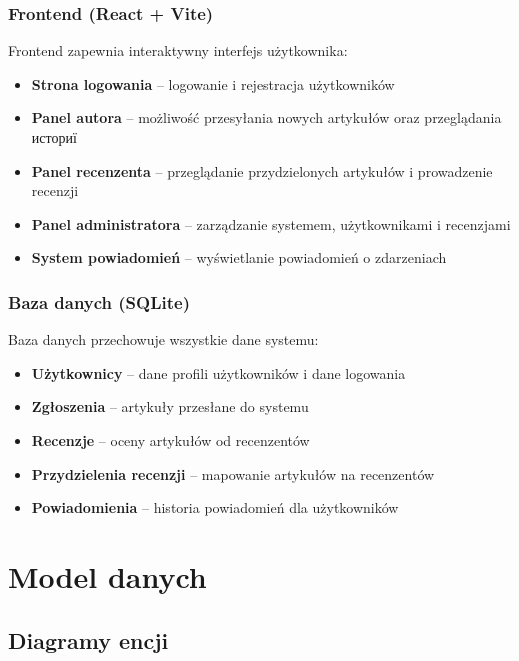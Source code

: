 \documentclass[times]{san}
\begin{document}
\subsubsection{Frontend (React + Vite)}

Frontend zapewnia interaktywny interfejs użytkownika:

\begin{itemize}
    \item \textbf{Strona logowania} -- logowanie i rejestracja użytkowników
    \item \textbf{Panel autora} -- możliwość przesyłania nowych artykułów oraz przeglądania историї
    \item \textbf{Panel recenzenta} -- przeglądanie przydzielonych artykułów i prowadzenie recenzji
    \item \textbf{Panel administratora} -- zarządzanie systemem, użytkownikami i recenzjami
    \item \textbf{System powiadomień} -- wyświetlanie powiadomień o zdarzeniach
\end{itemize}

\subsubsection{Baza danych (SQLite)}

Baza danych przechowuje wszystkie dane systemu:

\begin{itemize}
    \item \textbf{Użytkownicy} -- dane profili użytkowników i dane logowania
    \item \textbf{Zgłoszenia} -- artykuły przesłane do systemu
    \item \textbf{Recenzje} -- oceny artykułów od recenzentów
    \item \textbf{Przydzielenia recenzji} -- mapowanie artykułów na recenzentów
    \item \textbf{Powiadomienia} -- historia powiadomień dla użytkowników
\end{itemize}

\section{Model danych}

\subsection{Diagramy encji}
\end{document}

